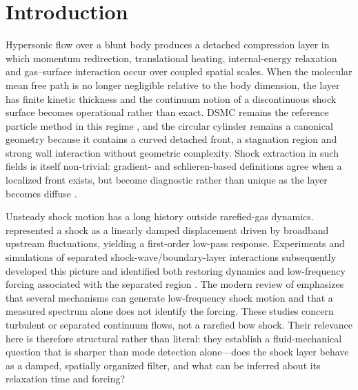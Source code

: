 \section{Introduction}
Hypersonic flow over a blunt body produces a detached compression layer in which momentum redirection, translational heating, internal-energy relaxation and gas--surface interaction occur over coupled spatial scales. When the molecular mean free path is no longer negligible relative to the body dimension, the layer has finite kinetic thickness and the continuum notion of a discontinuous shock surface becomes operational rather than exact. DSMC remains the reference particle method in this regime \citep{Bird1994,Lofthouse2007}, and the circular cylinder remains a canonical geometry because it contains a curved detached front, a stagnation region and strong wall interaction without geometric complexity. Shock extraction in such fields is itself non-trivial: gradient- and schlieren-based definitions agree when a localized front exists, but become diagnostic rather than unique as the layer becomes diffuse \citep{Akhlaghi2017,Akhlaghi2021}.

Unsteady shock motion has a long history outside rarefied-gas dynamics. \citet{Plotkin1975} represented a shock as a linearly damped displacement driven by broadband upstream fluctuations, yielding a first-order low-pass response. Experiments and simulations of separated shock-wave/boundary-layer interactions subsequently developed this picture and identified both restoring dynamics and low-frequency forcing associated with the separated region \citep{PoggieSmits2001,PoggieSmits2005,Dussauge2006,Dupont2006,Piponniau2009,TouberSandham2011,PriebeMartin2012}. The modern review of \citet{ClemensNarayanaswamy2014} emphasizes that several mechanisms can generate low-frequency shock motion and that a measured spectrum alone does not identify the forcing. These studies concern turbulent or separated continuum flows, not a rarefied bow shock. Their relevance here is therefore structural rather than literal: they establish a fluid-mechanical question that is sharper than mode detection alone---does the shock layer behave as a damped, spatially organized filter, and what can be inferred about its relaxation time and forcing?

